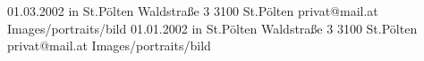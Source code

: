 
\begin{Diplomandenvorstellung}
		  {01.03.2002 in St.Pölten}
		  {Waldstraße 3}
		  {3100 St.Pölten}
		  {
		  }
		  {privat@mail.at}
		  {Images/portraits/bild}
\cleardoublepage
			{01.01.2002 in St.Pölten}
			{Waldstraße 3}
			{3100 St.Pölten}
			{
			}
			{privat@mail.at}
			{Images/portraits/bild}
\end{Diplomandenvorstellung}

